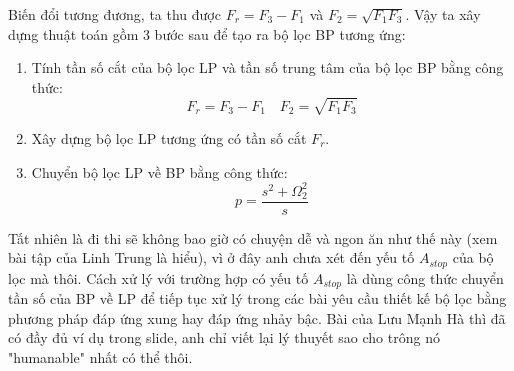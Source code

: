 \documentclass{article}
\begin{document}
Biến đổi tương đương, ta thu được $F_{r}=F_{3}-F_{1}$ và $F_{2}=\sqrt{F_{1}F_{3}}$. Vậy ta xây dựng thuật toán gồm 3 bước
sau để tạo ra bộ lọc BP tương ứng:
\begin{enumerate}
    \item Tính tần số cắt của bộ lọc LP và tần số trung tâm của bộ lọc BP bằng công thức:
    $$F_{r}=F_{3}-F_{1} \quad F_{2}=\sqrt{F_{1}F_{3}}$$
    \item Xây dựng bộ lọc LP tương ứng có tần số cắt $F_{r}$.
    \item Chuyển bộ lọc LP về BP bằng công thức:
    $$p=\frac{s^2+\Omega_{2}^2}{s}$$
\end{enumerate}
Tất nhiên là đi thi sẽ không bao giờ có chuyện dễ và ngon ăn như thế này (xem bài tập của Linh Trung là hiểu), vì ở đây anh chưa xét đến yếu tố $A_{stop}$ của
bộ lọc mà thôi. Cách xử lý với trường hợp có yếu tố $A_{stop}$ là dùng công thức chuyển tần số của BP về LP để tiếp tục xử lý trong các bài 
yêu cầu thiết kế bộ lọc bằng phương pháp đáp ứng xung hay đáp ứng nhảy bậc. Bài của Lưu Mạnh Hà thì đã có đầy đủ ví dụ trong slide, anh chỉ
viết lại lý thuyết sao cho trông nó "humanable" nhất có thể thôi.
\end{document}
